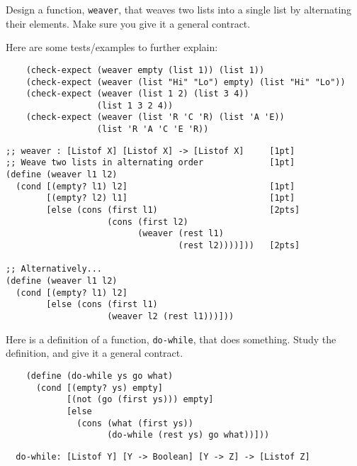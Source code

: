 \documentclass[12pt]{article}                   %
\def\pts#1{\marginpar{\footnotesize \raggedright  \fbox{#1 {\sc Points}}}}
\newenvironment{solution}{}{}
\begin{document}
\begin{problem} \pts{8}

  Design a function, \texttt{weaver}, that weaves two lists into a
  single list by alternating their elements.  Make sure you give it a
  general contract.

\bigskip

\noindent Here are some tests/examples to further explain:

\begin{verbatim}
    (check-expect (weaver empty (list 1)) (list 1))
    (check-expect (weaver (list "Hi" "Lo") empty) (list "Hi" "Lo"))
    (check-expect (weaver (list 1 2) (list 3 4))
                  (list 1 3 2 4))
    (check-expect (weaver (list 'R 'C 'R) (list 'A 'E))
                  (list 'R 'A 'C 'E 'R))
\end{verbatim}

\begin{solution}
\begin{verbatim}
;; weaver : [Listof X] [Listof X] -> [Listof X]     [1pt]
;; Weave two lists in alternating order             [1pt]
(define (weaver l1 l2)
  (cond [(empty? l1) l2]                            [1pt]
        [(empty? l2) l1]                            [1pt]
        [else (cons (first l1)                      [2pts]
                    (cons (first l2)
                          (weaver (rest l1)
                                  (rest l2))))]))   [2pts]

;; Alternatively...
(define (weaver l1 l2)
  (cond [(empty? l1) l2]
        [else (cons (first l1)
                    (weaver l2 (rest l1)))]))
\end{verbatim}
\end{solution}

\end{problem}

\ifrubric\bigskip\else
{}
\newpage
\fi

\begin{problem} \pts{6}

Here is a definition of a function, \texttt{do-while}, that does
something.  Study the definition, and give it a general contract.

\begin{verbatim}
    (define (do-while ys go what)
      (cond [(empty? ys) empty]
            [(not (go (first ys))) empty]
            [else
              (cons (what (first ys))
                    (do-while (rest ys) go what))]))
\end{verbatim}

\begin{solution}
\begin{verbatim}
  do-while: [Listof Y] [Y -> Boolean] [Y -> Z] -> [Listof Z]
\end{verbatim}
\end{solution}
\end{problem}
\end{document}

